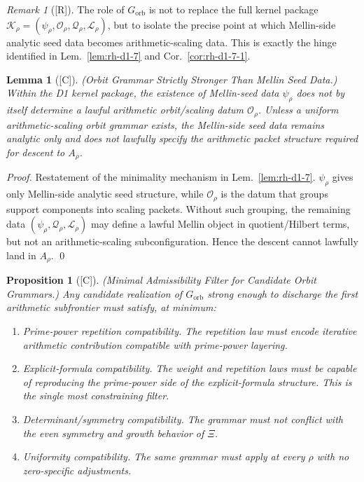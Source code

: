\documentclass[12pt,oneside]{amsbook}
\theoremstyle{plain}
\newtheorem{lemma}[theorem]{Lemma}
\newtheorem{proposition}[theorem]{Proposition}
\theoremstyle{definition}
\theoremstyle{remark}
\newtheorem{remark}[theorem]{Remark}
\newcommand{\status}[1]{\textup{[#1]}}
\begin{document}
\begin{remark}[\status{R}]\label{rem:rh-og-role}
The role of $G_{\mathrm{orb}}$ is not to replace the full kernel
package $\mathcal{K}_\rho = (\psi_\rho, \mathcal{O}_\rho,
\mathcal{Q}_\rho, \mathcal{L}_\rho)$, but to isolate the precise
point at which Mellin-side analytic seed data becomes
arithmetic-scaling data. This is exactly the hinge identified in
Lem.~\ref{lem:rh-d1-7} and Cor.~\ref{cor:rh-d1-7-1}.
\end{remark}

\begin{lemma}[\status{C}]\label{lem:rh-og-separation}
\textup{(Orbit Grammar Strictly Stronger Than Mellin Seed Data.)}
Within the D1 kernel package, the existence of Mellin-seed data
$\psi_\rho$ does not by itself determine a lawful arithmetic
orbit/scaling datum $\mathcal{O}_\rho$. Unless a uniform
arithmetic-scaling orbit grammar exists, the Mellin-side seed data
remains analytic only and does not lawfully specify the arithmetic
packet structure required for descent to $A_\rho$.
\end{lemma}

\begin{proof}
Restatement of the minimality mechanism in Lem.~\ref{lem:rh-d1-7}.
$\psi_\rho$ gives only Mellin-side analytic seed structure, while
$\mathcal{O}_\rho$ is the datum that groups support components into
scaling packets. Without such grouping, the remaining data
$(\psi_\rho, \mathcal{Q}_\rho, \mathcal{L}_\rho)$ may define a
lawful Mellin object in quotient/Hilbert terms, but not an
arithmetic-scaling subconfiguration. Hence the descent cannot
lawfully land in $A_\rho$. \qed
\end{proof}

\begin{proposition}[\status{C}]\label{prop:rh-og-candidate-filter}
\textup{(Minimal Admissibility Filter for Candidate Orbit Grammars.)}
Any candidate realization of $G_{\mathrm{orb}}$ strong enough to
discharge the first arithmetic subfrontier must satisfy, at minimum:
\begin{enumerate}[label=\textup{(\arabic*)}]
 \item \emph{Prime-power repetition compatibility.} The repetition
 law must encode iterative arithmetic contribution compatible with
 prime-power layering.
 \item \emph{Explicit-formula compatibility.} The weight and
 repetition laws must be capable of reproducing the prime-power
 side of the explicit-formula structure. This is the single most
 constraining filter.
 \item \emph{Determinant/symmetry compatibility.} The grammar must
 not conflict with the even symmetry and growth behavior of $\Xi$.
 \item \emph{Uniformity compatibility.} The same grammar must apply
 at every $\rho$ with no zero-specific adjustments.
\end{enumerate}
\end{proposition}
\end{document}
